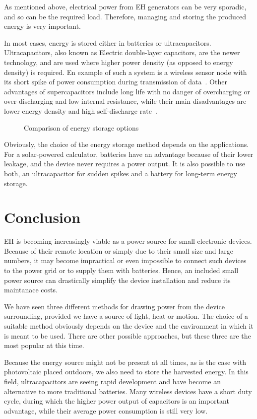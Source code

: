 \documentclass[a4paper,10pt]{article}
\begin{document}
As mentioned above, electrical power from \ac{EH} generators can be very sporadic, and so can be the required load. Therefore, managing and storing the produced energy is very important. 

In most cases, energy is stored either in batteries or ultracapacitors. Ultracapacitors, also known as Electric double-layer capacitors, are the newer technology, and are used where higher power density (as opposed to energy density) is required. En example of such a system is a wireless sensor node with its short spike of power consumption during transmission of data~\cite{cap-wsn-ieee}. Other advantages of supercapacitors include long life with no danger of overcharging or over-discharging and low internal resistance, while their main disadvantages are lower energy density and high self-discharge rate~\cite{wiki:edlc}. 

\begin{figure}[!h]
\def\svgwidth{0.8\textwidth}
 
\caption{Comparison of energy storage options~\cite{wiki:edlc}}
\label{fig:storage-chart}
\end{figure}

Obviously, the choice of the energy storage method depends on the applications. For a solar-powered calculator, batteries have an advantage because of their lower leakage, and the device never requires a power output. It is also possible to use both, an ultracapacitor for sudden spikes and a battery for long-term energy storage. 

\section{Conclusion}

\acf{EH} is becoming increasingly viable as a power source for small electronic devices. Because of their remote location or simply due to their small size and large numbers, it may become impractical or even impossible to connect such devices to the power grid or to supply them with batteries. Hence, an included small power source can drastically simplify the device installation and reduce its maintanace costs. 

We have seen three different methods for drawing power from the device surrounding, provided we have a source of light, heat or motion. The choice of a suitable method obviously depends on the device and the environment in which it is meant to be used. There are other possible approaches, but these three are the most popular at this time. 

Because the energy source might not be present at all times, as is the case with photovoltaic placed outdoors, we also need to store the harvested energy. In this field, ultracapacitors are seeing rapid development and have become an alternative to more traditional batteries. Many wireless devices have a short duty cycle, during which the higher power output of capacitors is an important advantage, while their average power consumption is still very low. 


 
\end{document}
